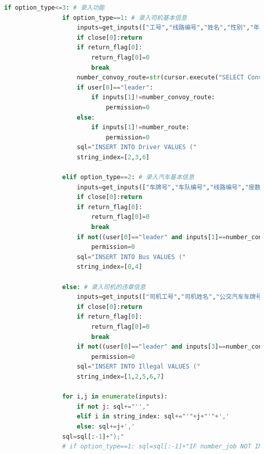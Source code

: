 \documentclass {article}
\begin{document}
\begin{lstlisting}[language=python]
            if option_type<=3: # 录入功能
                if option_type==1: # 录入司机基本信息
                    inputs=get_inputs(["工号","线路编号","姓名","性别","年龄","电话号码","家庭住址"],"请录入司机的基本信息，包括工号、线路编号、姓名、性别、年龄、电话号码、家庭住址：",inputs[:7])
                    if close[0]:return
                    if return_flag[0]:
                        return_flag[0]=0
                        break
                    number_convoy_route=str(cursor.execute("SELECT Convoy.number_convoy FROM Convoy, Route, Bus WHERE Convoy.number_convoy=Bus.number_convoy and Bus.number_route=Route.number_route and Route.number_route="+user[1]))
                    if user[0]=="leader":
                        if inputs[1]!=number_convoy_route: 
                            permission=0
                    else:
                        if inputs[1]!=number_route:
                            permission=0
                    sql="INSERT INTO Driver VALUES ("
                    string_index=[2,3,6]       

                elif option_type==2: # 录入汽车基本信息                 
                    inputs=get_inputs(["车牌号","车队编号","线路编号","座数","车型"],"请录入汽车的基本信息，包括车牌号、车队编号、线路编号、座数、车型：",inputs[:5])
                    if close[0]:return
                    if return_flag[0]:
                        return_flag[0]=0
                        break
                    if not((user[0]=="leader" and inputs[1]==number_convoy) or (user[0]=="route_leader" and inputs[2]==number_route)):
                        permission=0
                    sql="INSERT INTO Bus VALUES ("
                    string_index=[0,4]

                else: # 录入司机的违章信息
                    inputs=get_inputs(["司机工号","司机姓名","公交汽车车牌号","车队编号","线路编号","站点","时间","违章"],"请录入司机的违章信息，包括司机工号、车牌号、车队编号、站点、时间（YYYY-mm-dd HH:ii:ss格式）、违章：",inputs[:8])
                    if close[0]:return
                    if return_flag[0]:
                        return_flag[0]=0
                        break
                    if not((user[0]=="leader" and inputs[3]==number_convoy) or (user[0]=="route_leader" and inputs[4]==number_route)):
                        permission=0
                    sql="INSERT INTO Illegal VALUES ("
                    string_index=[1,2,5,6,7]
                
                for i,j in enumerate(inputs): 
                    if not j: sql+="'',"
                    elif i in string_index: sql+="'"+j+"'"+','
                    else: sql+=j+','
                sql=sql[:-1]+");"
                # if option_type==1: sql=sql[:-1]+"IF number_job NOT IN (SELECT number_job from leader)"
              

\end{lstlisting}
\end{document}
